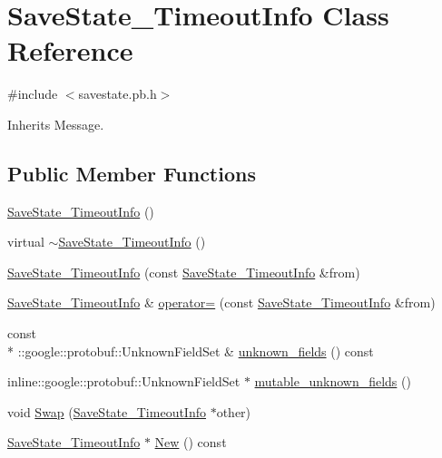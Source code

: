 \hypertarget{class_save_state___timeout_info}{\section{Save\-State\-\_\-\-Timeout\-Info Class Reference}
\label{class_save_state___timeout_info}
}


{\ttfamily \#include $<$savestate.\-pb.\-h$>$}



Inherits Message.

\subsection*{Public Member Functions}
\begin{DoxyCompactItemize}
\item 
\hyperlink{class_save_state___timeout_info_ad581a5618f52c6a30af88034c57a051f}{Save\-State\-\_\-\-Timeout\-Info} ()
\item 
virtual \hyperlink{class_save_state___timeout_info_a577d97470abf32b1980ac5669c69abe7}{$\sim$\-Save\-State\-\_\-\-Timeout\-Info} ()
\item 
\hyperlink{class_save_state___timeout_info_a4b7e2107f969db2308f92bf7e2f6e13b}{Save\-State\-\_\-\-Timeout\-Info} (const \hyperlink{class_save_state___timeout_info}{Save\-State\-\_\-\-Timeout\-Info} \&from)
\item 
\hyperlink{class_save_state___timeout_info}{Save\-State\-\_\-\-Timeout\-Info} \& \hyperlink{class_save_state___timeout_info_aedcfcf244d068bd913bc0724804a2918}{operator=} (const \hyperlink{class_save_state___timeout_info}{Save\-State\-\_\-\-Timeout\-Info} \&from)
\item 
const \\*
\-::google\-::protobuf\-::\-Unknown\-Field\-Set \& \hyperlink{class_save_state___timeout_info_aa8ad3c5b6bea53614b034cddca3ccc41}{unknown\-\_\-fields} () const 
\item 
inline\-::google\-::protobuf\-::\-Unknown\-Field\-Set $\ast$ \hyperlink{class_save_state___timeout_info_ac9a58e3e55b49a432fe2d6abc3aec31b}{mutable\-\_\-unknown\-\_\-fields} ()
\item 
void \hyperlink{class_save_state___timeout_info_ae870f674cfd0782b2fa7d237f04602d4}{Swap} (\hyperlink{class_save_state___timeout_info}{Save\-State\-\_\-\-Timeout\-Info} $\ast$other)
\item 
\hyperlink{class_save_state___timeout_info}{Save\-State\-\_\-\-Timeout\-Info} $\ast$ \hyperlink{class_save_state___timeout_info_aeb728e5b39116a8e17dbb8b17ed53814}{New} () const 

\end{DoxyCompactItemize}
